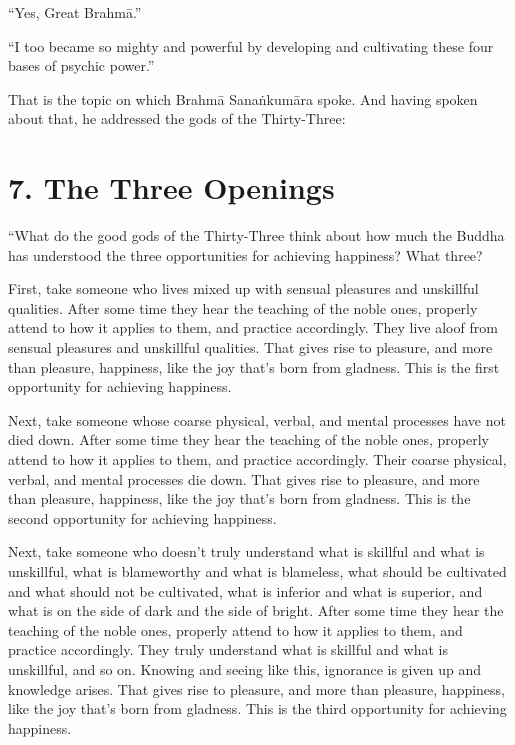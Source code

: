 \documentclass[12pt,openany]{book}%
\begin{document}
“Yes, Great \textsanskrit{Brahmā}.” 

“I too became so mighty and powerful by developing and cultivating these four bases of psychic power.” 

That is the topic on which \textsanskrit{Brahmā} \textsanskrit{Sanaṅkumāra} spoke. And having spoken about that, he addressed the gods of the Thirty-Three: 

\section*{7. The Three Openings }

“What do the good gods of the Thirty-Three think about how much the Buddha has understood the three opportunities for achieving happiness? What three? 

First, take someone who lives mixed up with sensual pleasures and unskillful qualities. After some time they hear the teaching of the noble ones, properly attend to how it applies to them, and practice accordingly. They live aloof from sensual pleasures and unskillful qualities. That gives rise to pleasure, and more than pleasure, happiness, like the joy that’s born from gladness. This is the first opportunity for achieving happiness. 

Next, take someone whose coarse physical, verbal, and mental processes have not died down. After some time they hear the teaching of the noble ones, properly attend to how it applies to them, and practice accordingly. Their coarse physical, verbal, and mental processes die down. That gives rise to pleasure, and more than pleasure, happiness, like the joy that’s born from gladness. This is the second opportunity for achieving happiness. 

Next, take someone who doesn’t truly understand what is skillful and what is unskillful, what is blameworthy and what is blameless, what should be cultivated and what should not be cultivated, what is inferior and what is superior, and what is on the side of dark and the side of bright. After some time they hear the teaching of the noble ones, properly attend to how it applies to them, and practice accordingly. They truly understand what is skillful and what is unskillful, and so on. Knowing and seeing like this, ignorance is given up and knowledge arises. That gives rise to pleasure, and more than pleasure, happiness, like the joy that’s born from gladness. This is the third opportunity for achieving happiness. 
\end{document}
